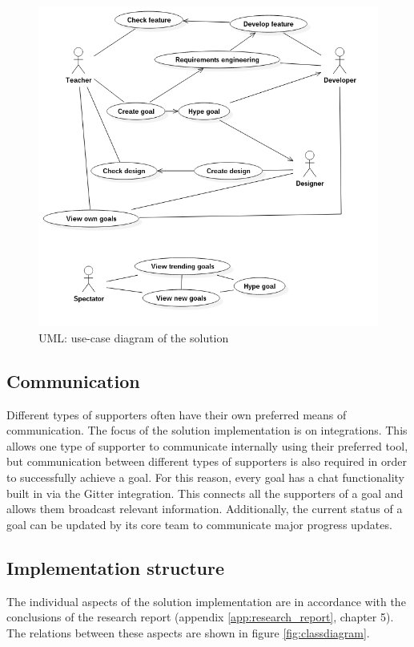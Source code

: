 \begin{figure}[ht]
    \centering
    \includegraphics*[width=\textwidth]{./media/UmlUseCase}
    \caption{UML: use-case diagram of the solution}
    \label{fig:usecase}
\end{figure}


\subsection{Communication}
Different types of supporters often have their own preferred means of communication. The focus of the solution implementation is on integrations. This allows one type of supporter to communicate internally using their preferred tool, but communication between different types of supporters is also required in order to successfully achieve a goal. For this reason, every goal has a chat functionality built in via the Gitter integration. This connects all the supporters of a goal and allows them broadcast relevant information. Additionally, the current status of a goal can be updated by its core team to communicate major progress updates.

\subsection{Implementation structure}

The individual aspects of the solution implementation are in accordance with the conclusions of the research report (appendix \ref{app:research_report}, chapter 5). The relations between these aspects are shown in figure \ref{fig:classdiagram}.

